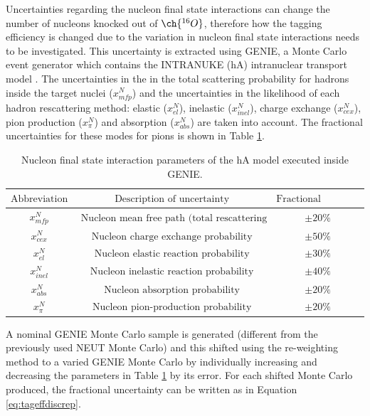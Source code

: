 Uncertainties regarding the nucleon final state interactions can change the number of nucleons knocked out of $\ch{^{16}O}$, therefore how the tagging efficiency is changed due to the variation in nucleon final state interactions needs to be investigated. This uncertainty is extracted using GENIE, a Monte Carlo event generator which contains the INTRANUKE (hA) intranuclear transport model \cite{andreopoulos2010genie}. The uncertainties in the in the total scattering probability for hadrons inside the target nuclei ($x_{m f p}^{N}$) and the uncertainties in the likelihood of each hadron rescattering method: elastic ($x_{e l}^{N}$), inelastic ($x_{i n e l}^{N}$), charge exchange ($x_{c e x}^{N}$), pion production ($x_{\pi}^{N}$) and absorption ($x_{a b s}^{N}$) are taken into account. The fractional uncertainties for these modes for pions is shown in Table \ref{table:nucleonfsiuncertainties}. 

\begin{table}
\begin{tabular}{||ccc||}
\hline
$\text {Abbreviation}$ & $\text { Description of uncertainty }$  & $\text{Fractional uncertainty}$ \\
\hline
$ x_{m f p}^{N}$ & $\text { Nucleon mean free path (total rescattering probability) }$ & $\pm 20 \%$ \\
$x_{c e x}^{N}$ & $\text { Nucleon charge exchange probability }$ & $\pm 50 \%$ \\
$x_{e l}^{N}$ & $\text { Nucleon elastic reaction probability }$ & $\pm 30 \%$ \\
$x_{i n e l}^{N}$ & $\text { Nucleon inelastic reaction probability }$ & $\pm 40 \%$ \\
$x_{a b s}^{N}$ & $\text { Nucleon absorption probability }$ & $\pm 20 \%$ \\
$x_{\pi}^{N}$ & $\text { Nucleon pion-production probability }$ & $\pm 20 \%$\\
\hline
\end{tabular}
\caption{Nucleon final state interaction parameters of the hA model executed inside GENIE.} 
\label{table:nucleonfsiuncertainties}
\end{table}

A nominal GENIE Monte Carlo sample is generated (different from the previously used NEUT Monte Carlo) and this shifted using the re-weighting method to a varied GENIE Monte Carlo by individually increasing and decreasing the parameters in Table \ref{table:nucleonfsiuncertainties} by its error. For each shifted Monte Carlo produced, the fractional uncertainty can be written as in Equation \ref{eq:tageffdiscrep}.

